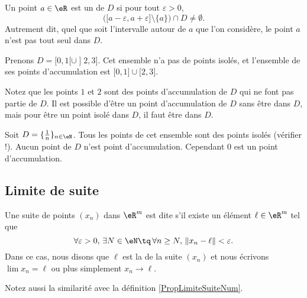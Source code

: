 Un point $a\in \eR$ est un  de $D$ si pour tout $\varepsilon>0$, 
\begin{equation}
	\Big( \mathopen[ a-\varepsilon , a+\varepsilon \mathclose]\setminus\{ a \} \Big)\cap D\neq\emptyset.
\end{equation}
Autrement dit, quel que soit l'intervalle autour de  $a$ que l'on considère, le point $a$ n'est pas tout seul dans $D$.

\begin{example}
	Prenons $D=\mathopen[ 0 , 1 [\cup\mathopen] 2 , 3 \mathclose]$. Cet ensemble n'a pas de points isolés, et l'ensemble de ses points d'accumulation est $\mathopen[ 0 , 1 \mathclose]\cup\mathopen[ 2,3  \mathclose]$.

	Notez que les points $1$ et $2$ sont des points d'accumulation de $D$ qui ne font pas partie de $D$. Il est possible d'être un point d'accumulation de $D$ sans être dans $D$, mais pour être un point isolé dans $D$, il faut être dans $D$.
\end{example}

\begin{example}
	Soit $D=\{ \frac{1}{ n }\}_{n\in\eN}$. Tous les points de cet ensemble sont des points isolés (vérifier !).  Aucun point de $D$ n'est point d'accumulation. Cependant $0$ est un point d'accumulation.
\end{example}

\cite{GGIibHE}

\subsection{Limite de suite}

\begin{definition}
	Une suite de points $(x_n)$ dans $\eR^m$ est dite  s'il existe un élément $\ell\in\eR^m$ tel que
	\begin{equation}	\label{EqCondLimSuite}
		\forall\varepsilon>0,\,\exists N\in \eN\tq\,\forall n\geq N,\,\| x_n-\ell \|<\varepsilon.
	\end{equation}
	Dans ce cas, nous disons que $\ell$ est la  de la suite $(x_n)$ et nous écrivons $\lim x_n=\ell$ ou plus simplement $x_n\to \ell$.
\end{definition}
Notez aussi la similarité avec la définition \ref{PropLimiteSuiteNum}.

